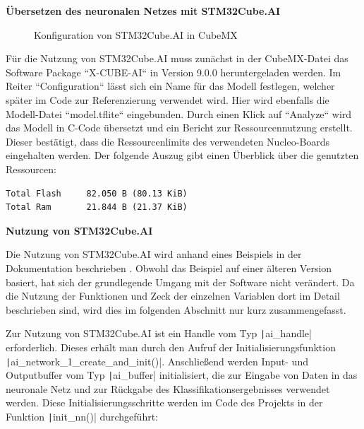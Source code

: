 \textbf{Übersetzen des neuronalen Netzes mit STM32Cube.AI}


\begin{figure} %
	\vspace{-20pt + 0.02\textwidth}
	\hspace{0.02\textwidth} %
	\caption{Konfiguration von STM32Cube.AI in CubeMX}
	\label{fig:img-training-graph}
\end{figure}

Für die Nutzung von STM32Cube.AI muss zunächst in der CubeMX-Datei das Software Package ``X-CUBE-AI`` in Version 9.0.0 heruntergeladen werden. Im Reiter ``Configuration`` lässt sich ein Name für das Modell festlegen, welcher später im Code zur Referenzierung verwendet wird. Hier wird ebenfalls die Modell-Datei ``model.tflite`` eingebunden. Durch einen Klick auf ``Analyze`` wird das Modell in C-Code übersetzt und ein Bericht zur Ressourcennutzung erstellt. Dieser bestätigt, dass die Ressourcenlimits des verwendeten Nucleo-Boards eingehalten werden. Der folgende Auszug gibt einen Überblick über die genutzten Ressourcen:

\begin{verbatim}
Total Flash		82.050 B (80.13 KiB)
Total Ram  		21.844 B (21.37 KiB)
\end{verbatim}



\textbf{Nutzung von STM32Cube.AI}

Die Nutzung von STM32Cube.AI wird anhand eines Beispiels in der Dokumentation beschrieben \cite{stm32-cube-ai-documentation}. Obwohl das Beispiel auf einer älteren Version basiert, hat sich der grundlegende Umgang mit der Software nicht verändert. Da die Nutzung der Funktionen und Zeck der einzelnen Variablen dort im Detail  beschrieben sind, wird dies im folgenden Abschnitt nur kurz zusammengefasst.

Zur Nutzung von STM32Cube.AI ist ein Handle vom Typ \texttt|ai_handle| erforderlich. Dieses erhält man durch den Aufruf der Initialisierungsfunktion \texttt|ai_network_1_create_and_init()|. Anschließend werden Input- und Outputbuffer vom Typ \texttt|ai_buffer| initialisiert, die zur Eingabe von Daten in das neuronale Netz und zur Rückgabe des Klassifikationsergebnisses verwendet werden. Diese Initialisierungsschritte werden im Code des Projekts in der Funktion \texttt|init_nn()| durchgeführt:

